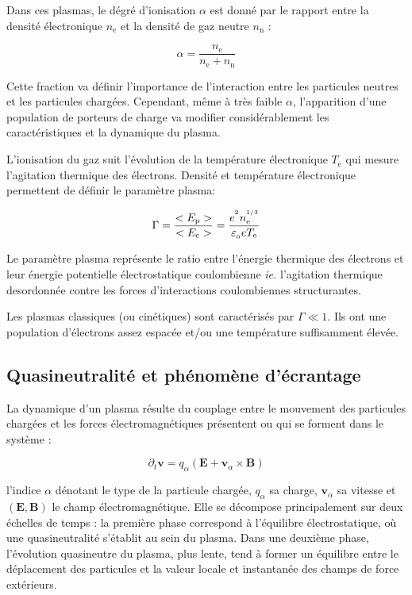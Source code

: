 Dans ces plasmas, le dégré d'ionisation $\alpha$ est donné par le rapport
entre la densité électronique $n_\text{e}$ et la densité de gaz neutre
$n_\text{n}$ :

\begin{equation}
\alpha=\frac{n_\text{e}}{n_\text{e}+n_\text{n}}
\end{equation}

Cette fraction va définir l'importance de l'interaction entre les particules
neutres et les particules chargées. Cependant, même à très faible $\alpha$,
l'apparition d'une population de porteurs de charge va modifier considérablement 
les caractéristiques et la dynamique du plasma.

L'ionisation du gaz suit l'évolution de la température électronique $T_\text{e}$
qui mesure l'agitation thermique des électrons. Densité et température
électronique permettent de définir le paramètre plasma:

\begin{equation}
\label{1-paramPlasma}
\Gamma=\frac{<E_\text{p}>}{<E_\text{c}>}=\frac{e^{^{2}}
n_\text{e}^{^{1/3}}}{\varepsilon_{_{0}} eT_\text{e}}
\end{equation}

Le paramètre plasma représente le ratio entre l'énergie thermique des
électrons et leur énergie potentielle électrostatique coulombienne \emph{ie.}
l'agitation thermique desordonnée contre les forces d'interactions
coulombiennes structurantes.

Les plasmas classiques (ou cinétiques) sont caractérisés par
$\Gamma\ll 1$. Ils ont une population d'électrons assez espacée et/ou une
température suffisamment élevée.

\subsection{Quasineutralité et phénomène d'écrantage}
La dynamique d'un plasma résulte du couplage entre le mouvement des
particules chargées et les forces électromagnétiques présentent ou qui se
forment dans le système :

\begin{equation}
\partial_t \mathbf v=q_\alpha(\mathbf E+ \mathbf v_\alpha\times\mathbf
B)
\end{equation}

l'indice $\alpha$ dénotant le type de la particule chargée, $q_\alpha$ sa
charge, $\mathbf v_\alpha$ sa vitesse et $(\mathbf E,\mathbf B)$ le champ
électromagnétique.
Elle se décompose principalement sur deux échelles de temps :
la première phase correspond à l'équilibre électrostatique, où une
quasineutralité s'établit au sein du plasma. Dans une deuxième phase, l'évolution quasineutre du
plasma, plus lente, tend à former un équilibre entre le déplacement des particules et la valeur locale
et instantanée des champs de force extérieurs.

